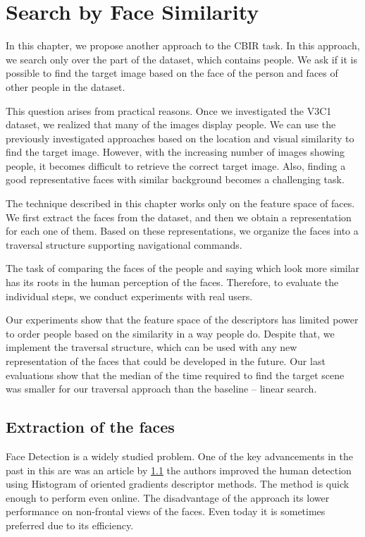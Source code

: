 \chapter{Search by Face Similarity}
\label{ch:face_search}

In this chapter, we propose another approach to the CBIR task. In this approach, we search only over the part of the dataset, which contains people. We ask if it is possible to find the target image based on the face of the person and faces of other people in the dataset.

This question arises from practical reasons. Once we investigated the V3C1 dataset, we realized that many of the images display people. We can use the previously investigated approaches based on the location and visual similarity to find the target image. However, with the increasing number of images showing people, it becomes difficult to retrieve the correct target image. Also, finding a good representative faces with similar background becomes a challenging task.

The technique described in this chapter works only on the feature space of faces. We first extract the faces from the dataset, and then we obtain a representation for each one of them. Based on these representations, we organize the faces into a traversal structure supporting navigational commands.

The task of comparing the faces of the people and saying which look more similar has its roots in the human perception of the faces. Therefore, to evaluate the individual steps, we conduct experiments with real users.

Our experiments show that the feature space of the descriptors has limited power to order people based on the similarity in a way people do. Despite that, we implement the traversal structure, which can be used with any new representation of the faces that could be developed in the future. Our last evaluations show that the median of the time required to find the target scene was smaller for our traversal approach than the baseline -- linear search.

\section{Extraction of the faces}

Face Detection is a widely studied problem. One of the key advancements in the past in this are was an article by \ref{} the authors improved the human detection using Histogram of oriented gradients descriptor methods. The method is quick enough to perform even online. The disadvantage of the approach its lower performance on non-frontal views of the faces. Even today it is sometimes preferred due to its efficiency.


